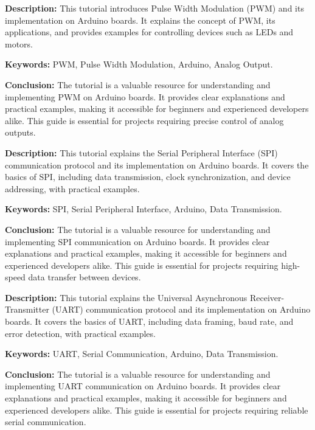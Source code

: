 {
	\textbf{Description:} This tutorial introduces Pulse Width Modulation (PWM) and its implementation on Arduino boards. It explains the concept of PWM, its applications, and provides examples for controlling devices such as LEDs and motors.
	\newline
	
	\textbf{Keywords:} PWM, Pulse Width Modulation, Arduino, Analog Output.
	
	\newpage
	\textbf{Conclusion:} The tutorial is a valuable resource for understanding and implementing PWM on Arduino boards. It provides clear explanations and practical examples, making it accessible for beginners and experienced developers alike. This guide is essential for projects requiring precise control of analog outputs\cite{ArduinoPWM:2024}.
}

{
	\textbf{Description:} This tutorial explains the Serial Peripheral Interface (SPI) communication protocol and its implementation on Arduino boards. It covers the basics of SPI, including data transmission, clock synchronization, and device addressing, with practical examples.
	\newline
	
	\textbf{Keywords:} SPI, Serial Peripheral Interface, Arduino, Data Transmission.
	
	\newpage
	\textbf{Conclusion:} The tutorial is a valuable resource for understanding and implementing SPI communication on Arduino boards. It provides clear explanations and practical examples, making it accessible for beginners and experienced developers alike. This guide is essential for projects requiring high-speed data transfer between devices\cite{ArduinoSPI:2024}.
}

{
	\textbf{Description:} This tutorial explains the Universal Asynchronous Receiver-Transmitter (UART) communication protocol and its implementation on Arduino boards. It covers the basics of UART, including data framing, baud rate, and error detection, with practical examples.
	\newline
	
	\textbf{Keywords:} UART, Serial Communication, Arduino, Data Transmission.
	
	\newpage
	\textbf{Conclusion:} The tutorial is a valuable resource for understanding and implementing UART communication on Arduino boards. It provides clear explanations and practical examples, making it accessible for beginners and experienced developers alike. This guide is essential for projects requiring reliable serial communication\cite{ArduinoUART:2024}.
}

